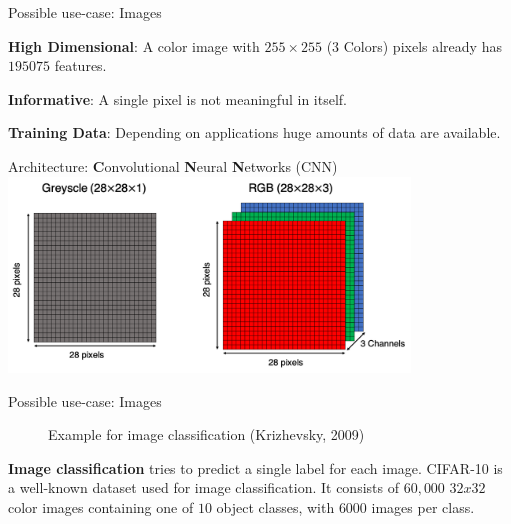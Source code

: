 \documentclass[11pt,compress,t,notes=noshow, xcolor=table]{beamer}
\begin{document}
\begin{frame}{Possible use-case: Images}
\begin{itemizeM}
\item \textbf{High Dimensional}: A color image with $255 \times 255$ (3 Colors) pixels already has $195075$ features.
\item \textbf{Informative}: A single pixel is not meaningful in itself.
\item \textbf{Training Data}: Depending on applications huge amounts of data are available.
\end{itemizeM}
Architecture: \textbf{C}onvolutional \textbf{N}eural \textbf{N}etworks (CNN)
\includegraphics[width=0.8\textwidth]{figure/three_channels.png}  
\end{frame}


\begin{frame} {Possible use-case: Images}
\begin{figure}
\centering
{}
\caption{Example for image classification (Krizhevsky, 2009)}
\end{figure}
\textbf{Image classification} tries to predict a single label for each image.
\footnotesize CIFAR-10 is a well-known dataset used for image classification. It consists of $60,000$ $32x32$ color images containing one of $10$ object classes, with $6000$ images per class. 
\end{frame}
\end{document}
